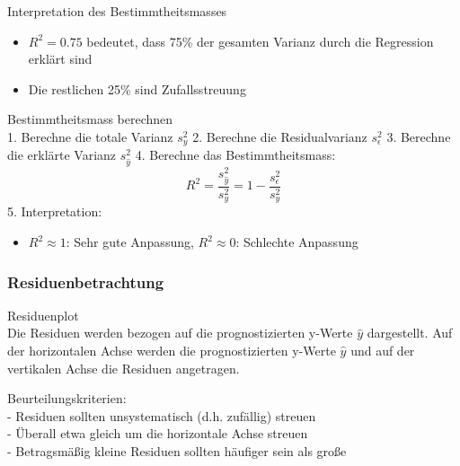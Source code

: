 \begin{corollary}{Interpretation des Bestimmtheitsmasses}
\begin{itemize}
  \item $R^2 = 0.75$ bedeutet, dass 75\% der gesamten Varianz durch die Regression erklärt sind
  \item Die restlichen 25\% sind Zufallsstreuung
\end{itemize}
\end{corollary}

\begin{KR}{Bestimmtheitsmass berechnen}\\
1. Berechne die totale Varianz $s_y^2$
2. Berechne die Residualvarianz $s_{\epsilon}^2$
3. Berechne die erklärte Varianz $s_{\hat{y}}^2$
4. Berechne das Bestimmtheitsmass:
   $$R^2 = \frac{s_{\hat{y}}^2}{s_y^2} = 1 - \frac{s_{\epsilon}^2}{s_y^2}$$
5. Interpretation:
   \begin{itemize}
     \item $R^2 \approx 1$: Sehr gute Anpassung, $R^2 \approx 0$: Schlechte Anpassung
   \end{itemize}
\end{KR}

\subsubsection{Residuenbetrachtung}

\begin{concept}{Residuenplot}\\
Die Residuen werden bezogen auf die prognostizierten y-Werte $\hat{y}$ dargestellt. Auf der horizontalen Achse werden die prognostizierten y-Werte $\hat{y}$ und auf der vertikalen Achse die Residuen angetragen.

Beurteilungskriterien:\\
- Residuen sollten unsystematisch (d.h. zufällig) streuen\\
- Überall etwa gleich um die horizontale Achse streuen\\
- Betragsmäßig kleine Residuen sollten häufiger sein als große
\end{concept}

